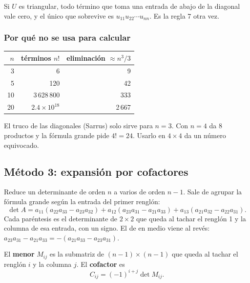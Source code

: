 \documentclass[11pt,letterpaper]{article}
\begin{document}
Si $U$ es triangular, todo término que toma una entrada de abajo de la
diagonal vale cero, y el único que sobrevive es $u_{11}u_{22} \cdots
u_{nn}$. Es la regla 7 otra vez.

\subsubsection*{Por qué no se usa para calcular}

\begin{center}
\begin{tabular}{rrr}
    \toprule
    $n$ & \textbf{términos} $n!$ & \textbf{eliminación} $\approx n^3/3$
    \\
    \midrule
    3  & 6                    & 9 \\
    5  & 120                  & 42 \\
    10 & 3\,628\,800          & 333 \\
    20 & $2.4 \times 10^{18}$ & 2\,667 \\
    \bottomrule
\end{tabular}
\end{center}

\begin{ojo}
    El truco de las diagonales (Sarrus) solo sirve para $n = 3$. Con
    $n = 4$ da 8 productos y la fórmula grande pide $4! = 24$. Usarlo
    en $4 \times 4$ da un número equivocado.
\end{ojo}


\subsection*{Método 3: expansión por cofactores}

Reduce un determinante de orden $n$ a varios de orden $n - 1$. Sale de
agrupar la fórmula grande según la entrada del primer renglón:
\[
    \det A = a_{11}(a_{22}a_{33} - a_{23}a_{32})
           + a_{12}(a_{23}a_{31} - a_{21}a_{33})
           + a_{13}(a_{21}a_{32} - a_{22}a_{31}) .
\]
Cada paréntesis es el determinante de $2 \times 2$ que queda al tachar
el renglón 1 y la columna de esa entrada, con un signo. El de en medio
viene al revés: $a_{23}a_{31} - a_{21}a_{33}
= -(a_{21}a_{33} - a_{23}a_{31})$.

\begin{definicion}
    El \textbf{menor} $M_{ij}$ es la submatriz de $(n-1) \times (n-1)$
    que queda al tachar el renglón $i$ y la columna $j$. El
    \textbf{cofactor} es
    \[
        C_{ij} = (-1)^{i+j} \det M_{ij} .
    \]
\end{definicion}
\end{document}
